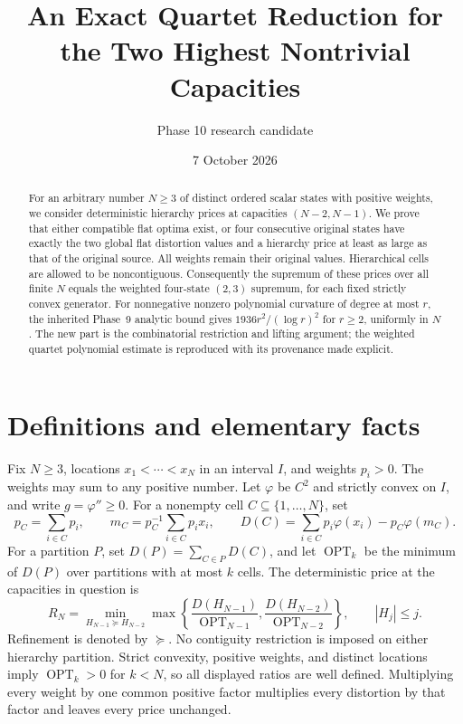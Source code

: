 \documentclass[11pt]{article}
\title{An Exact Quartet Reduction for the Two Highest Nontrivial Capacities}
\author{Phase 10 research candidate}
\date{7 October 2026}
\theoremstyle{remark}\newtheorem{remark}[theorem]{Remark}
\newcommand{\OPT}{\operatorname{OPT}}
\begin{document}
\maketitle

\begin{abstract}
For an arbitrary number $N\ge3$ of distinct ordered scalar states with
positive weights, we consider deterministic hierarchy prices at capacities
$(N-2,N-1)$. We prove that either compatible flat optima exist, or four
consecutive original states have exactly the two global flat distortion
values and a hierarchy price at least as large as that of the original
source. All weights remain their original values. Hierarchical cells are
allowed to be noncontiguous. Consequently the supremum of these prices
over all finite $N$ equals the weighted four-state $(2,3)$ supremum, for
each fixed strictly convex generator. For nonnegative nonzero polynomial
curvature of degree at most $r$, the inherited Phase~9 analytic bound gives
$1936r^2/(\log r)^2$ for $r\ge2$, uniformly in $N$. The new part is the
combinatorial restriction and lifting argument; the weighted quartet
polynomial estimate is reproduced with its provenance made explicit.
\end{abstract}

\section{Definitions and elementary facts}

Fix $N\ge3$, locations $x_1<\cdots<x_N$ in an interval $I$, and weights
$p_i>0$. The weights may sum to any positive number. Let $\varphi$ be
$C^2$ and strictly convex on $I$, and write $g=\varphi''\ge0$.
For a nonempty cell $C\subseteq\{1,\ldots,N\}$, set
\[
 p_C=\sum_{i\in C}p_i,\qquad
 m_C=p_C^{-1}\sum_{i\in C}p_ix_i,\qquad
 D(C)=\sum_{i\in C}p_i\varphi(x_i)-p_C\varphi(m_C).
\]
For a partition $P$, set $D(P)=\sum_{C\in P}D(C)$, and let
$\OPT_k$ be the minimum of $D(P)$ over partitions with at most $k$ cells.
The deterministic price at the capacities in question is
\[
 R_N=\min_{H_{N-1}\succeq H_{N-2}}
 \max\left\{
 \frac{D(H_{N-1})}{\OPT_{N-1}},
 \frac{D(H_{N-2})}{\OPT_{N-2}}\right\},
 \qquad |H_j|\le j.
\]
Refinement is denoted by $\succeq$. No contiguity restriction is imposed
on either hierarchy partition. Strict convexity, positive weights, and
distinct locations imply $\OPT_k>0$ for $k<N$, so all displayed ratios
are well defined. Multiplying every weight by one common positive factor
multiplies every distortion by that factor and leaves every price unchanged.
\end{document}
